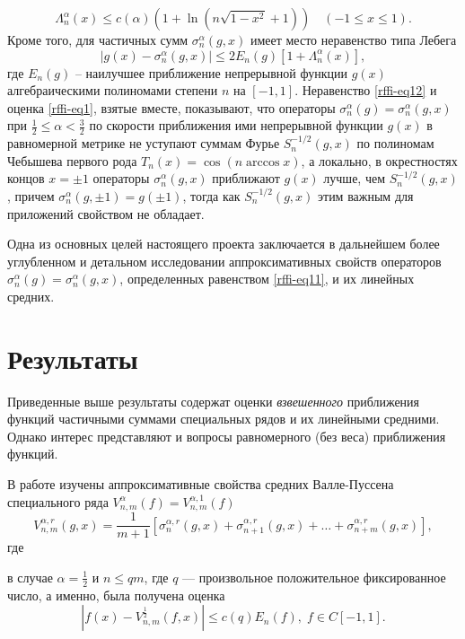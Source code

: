 \begin{equation}\label{rffi-eq1}
\Lambda_n^\alpha(x)\le c(\alpha)(1+\ln(n\sqrt{1-x^2}+1))\quad(-1\le x\le1).
\end{equation}
Кроме того, для частичных сумм $\sigma_n^\alpha(g,x)$ имеет место неравенство типа Лебега
\begin{equation}\label{rffi-eq12}
|g(x)-\sigma_n^\alpha(g,x)|\le 2E_n(g)[1+\Lambda_n^\alpha(x)],
\end{equation}
где $E_n(g)$ -- наилучшее приближение непрерывной функции $g(x)$ алгебраическими полиномами степени $n$ на $[-1,1]$. Неравенство \eqref{rffi-eq12} и оценка \eqref{rffi-eq1}, взятые вместе, показывают, что операторы  $\sigma_n^\alpha(g)=\sigma_n^\alpha(g,x)$ при $\frac12\le \alpha< \frac32$ по скорости приближения ими непрерывной функции $g(x)$ в равномерной метрике не уступают суммам Фурье $S_n^{-1/2}(g,x)$ по полиномам Чебышева первого рода  $T_n(x)=\cos(n\arccos x)$, а локально, в окрестностях концов $x=\pm1$ операторы $\sigma_n^\alpha(g,x)$ приближают $g(x)$ лучше, чем $S_n^{-1/2}(g,x)$, причем $\sigma_n^\alpha(g,\pm1)=g(\pm1)$, тогда как $S_n^{-1/2}(g,x)$ этим важным для приложений свойством не обладает.

Одна из основных целей настоящего проекта заключается в дальнейшем более углубленном и детальном исследовании аппроксимативных свойств операторов $\sigma_n^\alpha(g)=\sigma_n^\alpha(g,x)$, определенных равенством \eqref{rffi-eq11}, и их линейных средних.
\section{Результаты}
Приведенные выше результаты содержат оценки \textit{взвешенного} приближения функций частичными суммами специальных рядов и их линейными средними. Однако интерес представляют и вопросы равномерного (без веса) приближения функций.

В работе \cite{rffi-15} изучены аппроксимативные свойства средних Валле-Пуссена специального ряда $V_{n,m}^\alpha(f)=V_{n,m}^{\alpha,1}(f)$ 
\begin{equation}\label{rffi-vp-r}
	V_{n,m}^{\alpha, r}(g, x) = \frac{1}{m+1} \left[ \sigma_n^{\alpha, r}(g, x) + \sigma_{n+1}^{\alpha, r}(g, x) + \ldots + \sigma_{n+m}^{\alpha, r}(g, x) \right],
\end{equation}
где

в случае $\alpha=\frac{1}{2}$ и $n \le qm$, где $q$ --- произвольное положительное фиксированное число, а именно, была получена оценка
\begin{equation}\label{rffi-est-Vp05}
|f(x)-V_{n,m}^\frac{1}{2}(f,x)| \le c(q) E_n(f), \; f \in C[-1,1].
\end{equation}

